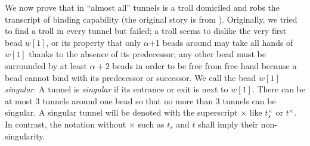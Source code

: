 We now prove that in ``almost all'' tunnels is a troll domiciled and robs the transcript of binding capability (the original story is from \cite{Pratchett1992}). 
Originally, we tried to find a troll in every tunnel but failed; a troll seems to dislike the very first bead $w[1]$, or its property that only $\alpha$+1 beads around may take all hands of $w[1]$ thanks to the absence of its predecessor; any other bead must be surrounded by at least $\alpha+2$ beads in order to be free from free hand because a bead cannot bind with its predecessor or successor. 
We call the bead $w[1]$ \textit{singular}. 
A tunnel is \textit{singular} if its entrance or exit is next to $w[1]$. 
There can be at most 3 tunnels around one bead so that no more than 3 tunnels can be singular. 
A singular tunnel will be denoted with the superscript $\times$ like $t_s^\times$ or $t^\times$. 
In contrast, the notation without $\times$ such as $t_s$ and $t$ shall imply their non-singularity. 

